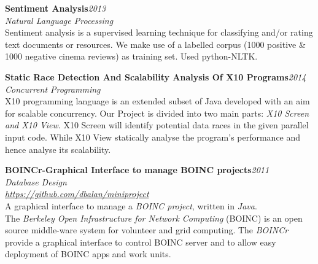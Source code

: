 \documentclass[line, margin]{res}
\begin{document}
\begin{resume}
  \textbf{Sentiment Analysis}\hfill \textit{2013}\\
  \textit{Natural Language Processing}\\
  Sentiment analysis is a supervised learning technique for classifying and/or rating text documents or resources. We make use of a labelled corpus (1000 positive \& 1000 negative cinema reviews) as training set. Used python-NLTK.\newline


  \textbf{Static Race Detection And Scalability Analysis Of X10 Programs}\hfill\textit{2014}\\
  \textit{Concurrent Programming}\\
  X10 programming language is an extended subset of Java developed with an aim for
  scalable concurrency. Our Project is divided into two main parts: \textit{X10 Screen and X10 View}. X10 Screen will identify potential data races in the given parallel input code. While X10 View statically analyse the program's performance and hence analyse its scalability.\newline


  \textbf{ BOINCr-Graphical Interface to manage BOINC projects}\hfill \textit{2011}\\
  \textit{Database Design}\\
  \textit{\url{https://github.com/dbalan/miniproject}}\\
  A graphical interface to manage a \textit{BOINC project}, written in \textit{Java}.\\
  The \textit{Berkeley Open Infrastructure for Network Computing} (BOINC) is an open source middle-ware system for volunteer and grid computing. The \textit{BOINCr} provide a graphical interface to control BOINC server and to allow easy deployment of BOINC apps and work units.\\\\



\end{resume}
\end{document}
